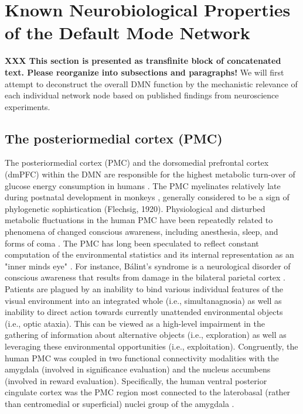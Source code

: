\documentclass[10pt,letterpaper]{article}
\begin{document}
\section{Known Neurobiological Properties of the Default Mode Network}
\textbf{XXX This section is presented as transfinite block of concatenated text.
  Please reorganize into subsections and paragraphs!}
We will first attempt to deconstruct the overall DMN function
by the mechanistic relevance of each individual network node
based on published findings from neuroscience experiments.
%
\subsection{The posteriormedial cortex (PMC)}
The posteriormedial cortex (PMC) and
the dorsomedial prefrontal cortex (dmPFC) within the DMN
are responsible for the highest metabolic turn-over
of glucose energy consumption in humans \citep{raichle2001pnas}.
The PMC myelinates relatively late during postnatal development in monkeys
\citep{goldman1987development}, generally considered to
be a sign of phylogenetic sophistication (Flechsig, 1920).
Physiological and disturbed metabolic fluctuations in the
human PMC have been repeatedly related to
phenomena of changed conscious awareness,
including anesthesia,
sleep, and forms of coma \citep{cavanna2006precuneus}.
%
The PMC has long been speculated to reflect constant computation of
the environmental statistics and its internal representation
as an "inner minds eye" \citep{cavanna2006precuneus}.
For instance, B\'alint's syndrome is a neurological disorder of conscious
awareness that results from damage in the bilateral parietal cortex
\citep{balint1909seelenlahmung}.
Patients are plagued by an
inability to bind various individual features of the visual
environment into an integrated whole (i.e., simultanagnosia)
as well as inability to direct action towards
currently unattended environmental objects
(i.e., optic ataxia).
This can be viewed as a high-level impairment in the gathering
of information about alternative objects (i.e., exploration) as well as
leveraging these environmental opportunities (i.e., exploitation).
Congruently,
the human PMC was coupled in two functional connectivity modalities
with the amygdala
(involved in significance evaluation) and
the nucleus accumbens (involved in reward evaluation).
Specifically, the human ventral posterior cingulate cortex was
the PMC region most connected to the laterobasal
(rather than centromedial or superficial) nuclei group
of the amygdala \citep{bzdok2015subspecialization}.
\end{document}
